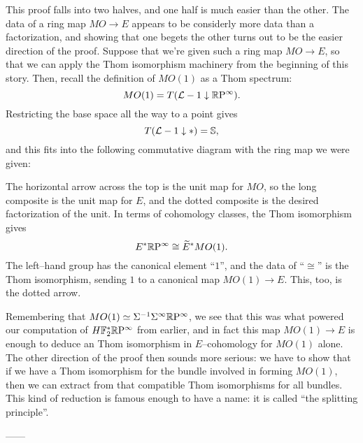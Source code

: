 \noindent This proof falls into two halves, and one half is much easier than the other.  The data of a ring map $MO \to E$ appears to be considerly more data than a factorization, and showing that one begets the other turns out to be the easier direction of the proof.  Suppose that we're given such a ring map $MO \to E$, so that we can apply the Thom isomorphism machinery from the beginning of this story.  Then, recall the definition of $MO(1)$ as a Thom spectrum: \[MO(1) = T(\mathcal{L} - 1 \downarrow \mathbb R\mathrm P^\infty).\]  Restricting the base space all the way to a point gives \[T(\mathcal{L} - 1 \downarrow *) = \mathbb S,\] and this fits into the following commutative diagram with the ring map we were given:
\begin{center}
\end{center}
The horizontal arrow across the top is the unit map for $MO$, so the long composite is the unit map for $E$, and the dotted composite is the desired factorization of the unit.  In terms of cohomology classes, the Thom isomorphism gives \[E^* \mathbb R\mathrm P^\infty \cong \widetilde E^* MO(1).\]  The left--hand group has the canonical element ``$1$'', and the data of ``$\cong$'' is the Thom isomorphism, sending $1$ to a canonical map $MO(1) \to E$.  This, too, is the dotted arrow.

Remembering that $MO(1) \simeq \Sigma^{-1} \Sigma^\infty \mathbb R\mathrm P^\infty$, we see that this was what powered our computation of $H\mathbb F_2^* \mathbb R\mathrm P^\infty$ from earlier, and in fact this map $MO(1) \to E$ is enough to deduce an Thom isomorphism in $E$--cohomology for $MO(1)$ alone.  The other direction of the proof then sounds more serious: we have to show that if we have a Thom isomorphism for the bundle involved in forming $MO(1)$, then we can extract from that compatible Thom isomorphisms for all bundles.  This kind of reduction is famous enough to have a name: it is called ``the splitting principle''.


------

